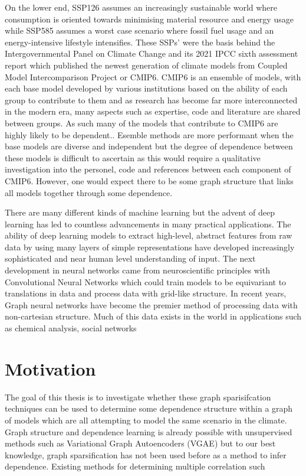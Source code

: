 \documentclass[honours,12pt]{unswthesis}
\numberwithin{equation}{section}
\begin{document}
\noindent On the lower end, SSP126 assumes an increasingly sustainable world where consumption is oriented towards minimising material resource and energy usage
while SSP585 assumes a worst case scenario where fossil fuel usage and an energy-intensive lifestyle intensifies. These SSPs' were the basis behind the Intergovernmental
Panel on Climate Change and its 2021 IPCC sixth assessment report which published the newest generation of climate models from Coupled Model Intercomparison Project
or CMIP6.\cite{lee2021future} CMIP6 is an ensemble of models, with each base model developed by various institutions based on the ability of each group to contribute to them and as research has become
far more interconnected in the modern era, many aspects such as expertise, code and literature are shared between groups. As such many of the models that contribute to CMIP6
are highly likely to be dependent.\cite{ClimateModelDependenceandtheEnsembleDependenceTransformationofCMIPProjections}. Esemble methods are more performant when the base models
are diverse and independent\cite{KOTU201919} but the degree of dependence between these models
is difficult to ascertain as this would require a qualitative investigation into the personel, code and references between each component of CMIP6. However, one would expect
there to be some graph structure that links all models together through some dependence.

{\noindent}There are many different kinds of machine learning but the advent of deep learning has led to countless advancements in many practical applications. 
The ability of deep learning models to extract high-level, abstract features from raw data by using many layers of simple representations have developed increasingly
sophisticated and near human level understanding of input.\cite{Goodfellow-et-al-2016} The next development in neural networks came from neuroscientific principles\cite{Hubel_Wiesel_1962} with 
Convolutional Neural Networks which could train models to be equivariant to translations in data and process data with grid-like structure. In recent years, Graph neural networks have become the premier method of processing 
data with non-cartesian structure. Much of this data exists in the world in applications such as chemical analysis\cite{xu2022chemistry}, social networks\cite{rath2020detecting} 


{\section{Motivation}}\label{motivation}
The goal of this thesis is to investigate whether these graph sparisifcation techniques can be used to determine some dependence structure within a graph of models which
are all attempting to model the same scenario in the climate. Graph structure and dependence learning is already possible with unsupervised methods such as Variational Graph Autoencoders (VGAE)\cite{pmlr-v97-yu19a}
but to our best knowledge, graph sparsification has not been used before as a method to infer dependence. Existing methods for determining multiple correlation such
\end{document}
